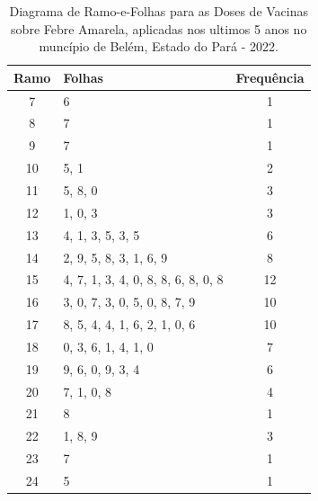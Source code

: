 \begin{table}[!htb]
    \centering
    {
    \caption{Diagrama de Ramo-e-Folhas para as Doses de Vacinas sobre Febre Amarela, aplicadas nos ultimos 5 anos no muncípio de Belém, Estado do Pará - 2022.}
    \label{ramosfolhas}
    \vspace{0.1cm}
\begin{tabular}{c|l|c}
\hline \hline
\textbf{Ramo} & \textbf{Folhas} & \textbf{Frequência} \\
\hline \hline 
 7  &  6                                   & 1  \\
 8  &  7                                   & 1  \\
 9  &  7                                   & 1  \\
 10 &  5, 1                                & 2  \\
 11 &  5, 8, 0                             & 3  \\
 12 &  1, 0, 3                             & 3  \\
 13 &  4, 1, 3, 5, 3, 5                    & 6  \\
 14 &  2, 9, 5, 8, 3, 1, 6, 9              & 8  \\
 15 &  4, 7, 1, 3, 4, 0, 8, 8, 6, 8, 0, 8  & 12 \\
 16 &  3, 0, 7, 3, 0, 5, 0, 8, 7, 9        & 10 \\
 17 &  8, 5, 4, 4, 1, 6, 2, 1, 0, 6        & 10 \\
 18 &  0, 3, 6, 1, 4, 1, 0                 & 7  \\
 19 &  9, 6, 0, 9, 3, 4                    & 6  \\
 20 &  7, 1, 0, 8                          & 4  \\
 21 &  8                                   & 1  \\
 22 &  1, 8, 9                             & 3  \\
 23 &  7                                   & 1  \\
 24 &  5                                   & 1  \\
 \hline \hline
\end{tabular}}
\end{table}





